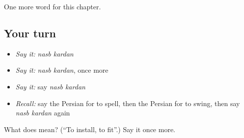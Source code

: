 \begin{grammarlens}[title={What you've built}]
One more word for this chapter.
\end{grammarlens}

\subsection*{Your turn}
\begin{itemize}
\raggedright
  \item \emph{Say it:} \emph{nasb kardan}
  \item \emph{Say it:} \emph{nasb kardan}, once more
  \item \emph{Say it:} say \emph{nasb kardan}
  \item \emph{Recall:} say the Persian for to spell, then the Persian for to swing, then say \emph{nasb kardan} again
\end{itemize}

\begin{tcolorbox}[breakable,colback=teal!4,colframe=teal!35!black,title={Before you move on}]
What does   mean? (\textquotedblleft{}To install, to fit\textquotedblright{}.) Say it once more.
\end{tcolorbox}
